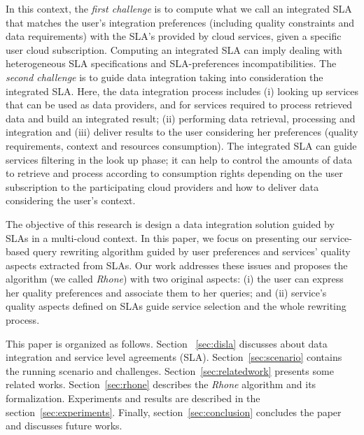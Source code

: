 In this context, the \textit{first challenge} is to compute what we call an integrated SLA that matches the user's integration preferences (including quality constraints and data requirements) with the SLA's provided by cloud services, given a specific user cloud subscription. Computing an integrated SLA can imply dealing with heterogeneous SLA specifications and SLA-preferences incompatibilities. The \textit{second challenge} is to guide data integration taking into
consideration the integrated SLA. Here, the data integration process includes (i) looking up services that can be used as data providers, and for services required to process retrieved data and build an integrated result; (ii) performing data retrieval, processing and integration and (iii) deliver results to the user considering her preferences (quality requirements, context and resources consumption). The integrated SLA can guide services filtering in the look up phase; it can help to control the amounts of data to retrieve and process according to consumption rights depending on the
user subscription to the participating cloud providers and how to deliver data considering the user's context.          

The objective of this research is design a data integration solution guided by SLAs in a multi-cloud context. In this paper, we focus on presenting our service-based query rewriting algorithm guided by user preferences and services' quality aspects extracted from SLAs. Our work addresses these issues and proposes the algorithm (we called \textit{Rhone}) with two original aspects: (i) the user can express her quality preferences and associate them to her queries; and (ii) service's quality aspects defined on SLAs guide service selection and the whole rewriting process.

This paper is organized as follows. Section ~\ref{sec:disla} discusses about data integration and service level agreements (SLA). Section~\ref{sec:scenario} contains the running scenario and challenges. Section~\ref{sec:relatedwork} presents some related works. Section~\ref{sec:rhone} describes the \textit{Rhone} algorithm and its formalization. Experiments and results are described in the section~\ref{sec:experiments}. Finally, section~\ref{sec:conclusion} concludes the paper and discusses future works.

